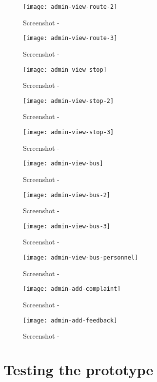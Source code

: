 \begin {figure} [H]
\centering
\texttt{[image: admin-view-route-2]}
\caption [Screenshot - ] {Screenshot - }
\label {image-admin-view-route-2}
\end {figure}

\begin {figure} [H]
\centering
\texttt{[image: admin-view-route-3]}
\caption [Screenshot - ] {Screenshot - }
\label {image-admin-view-route-3}
\end {figure}

\begin {figure} [H]
\centering
\texttt{[image: admin-view-stop]}
\caption [Screenshot - ] {Screenshot - }
\label {image-admin-view-stop}
\end {figure}

\begin {figure} [H]
\centering
\texttt{[image: admin-view-stop-2]}
\caption [Screenshot - ] {Screenshot - }
\label {image-admin-view-stop-2}
\end {figure}

\begin {figure} [H]
\centering
\texttt{[image: admin-view-stop-3]}
\caption [Screenshot - ] {Screenshot - }
\label {image-admin-view-stop-3}
\end {figure}

\begin {figure} [H]
\centering
\texttt{[image: admin-view-bus]}
\caption [Screenshot - ] {Screenshot - }
\label {image-admin-view-bus}
\end {figure}

\begin {figure} [H]
\centering
\texttt{[image: admin-view-bus-2]}
\caption [Screenshot - ] {Screenshot - }
\label {image-admin-view-bus-2}
\end {figure}

\begin {figure} [H]
\centering
\texttt{[image: admin-view-bus-3]}
\caption [Screenshot - ] {Screenshot - }
\label {image-admin-view-bus-3}
\end {figure}

\begin {figure} [H]
\centering
\texttt{[image: admin-view-bus-personnel]}
\caption [Screenshot - ] {Screenshot - }
\label {image-admin-view-bus-personnel}
\end {figure}

\begin {figure} [H]
\centering
\texttt{[image: admin-add-complaint]}
\caption [Screenshot - ] {Screenshot - }
\label {image-admin-add-complaint}
\end {figure}

\begin {figure} [H]
\centering
\texttt{[image: admin-add-feedback]}
\caption [Screenshot - ] {Screenshot - }
\label {image-admin-add-feedback}
\end {figure}



\section{Testing the prototype}

\paragraph{} 




